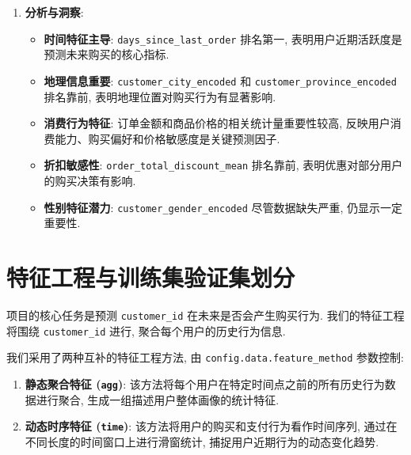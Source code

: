 \documentclass[11pt, a4paper]{article}
\begin{document}
\begin{enumerate}
    \item \textbf{分析与洞察}:
    \begin{itemize}
        \item \textbf{时间特征主导}: \texttt{days\_since\_last\_order} 排名第一, 表明用户近期活跃度是预测未来购买的核心指标.
        \item \textbf{地理信息重要}: \texttt{customer\_city\_encoded} 和 \texttt{customer\_province\_encoded} 排名靠前, 表明地理位置对购买行为有显著影响.
        \item \textbf{消费行为特征}: 订单金额和商品价格的相关统计量重要性较高, 反映用户消费能力、购买偏好和价格敏感度是关键预测因子.
        \item \textbf{折扣敏感性}: \texttt{order\_total\_discount\_mean} 排名靠前, 表明优惠对部分用户的购买决策有影响.
        \item \textbf{性别特征潜力}: \texttt{customer\_gender\_encoded} 尽管数据缺失严重, 仍显示一定重要性.
    \end{itemize}
\end{enumerate}


\section{特征工程与训练集验证集划分}
项目的核心任务是预测 \texttt{customer\_id} 在未来是否会产生购买行为. 我们的特征工程将围绕 \texttt{customer\_id} 进行, 聚合每个用户的历史行为信息.

我们采用了两种互补的特征工程方法, 由 \texttt{config.data.feature\_method} 参数控制:
\begin{enumerate}
    \item \textbf{静态聚合特征 (\texttt{agg})}: 该方法将每个用户在特定时间点之前的所有历史行为数据进行聚合, 生成一组描述用户整体画像的统计特征.
    \item \textbf{动态时序特征 (\texttt{time})}: 该方法将用户的购买和支付行为看作时间序列, 通过在不同长度的时间窗口上进行滑窗统计, 捕捉用户近期行为的动态变化趋势.
\end{enumerate}
\end{document}
